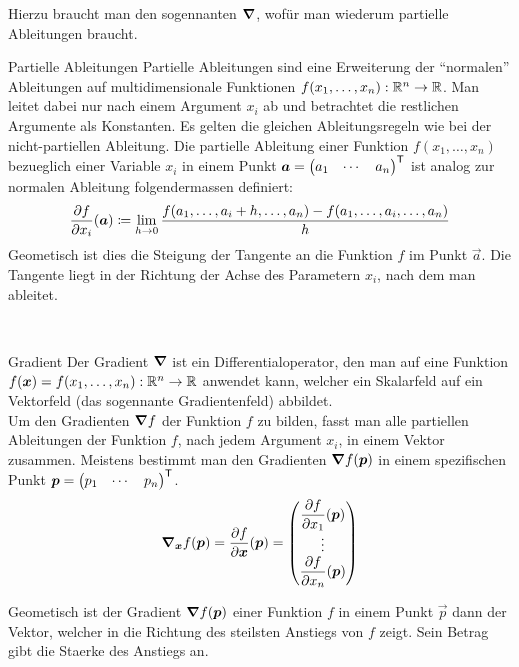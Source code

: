 Hierzu braucht man den sogennanten  $\bm{\nabla}$, wofür man wiederum partielle Ableitungen braucht.
\para{}
\begin{defbox}{Partielle Ableitungen}\label{ref:partielle_ableitungen}
  Partielle Ableitungen sind eine Erweiterung der ``normalen'' Ableitungen auf
  multidimensionale Funktionen $f(x_1,\ldots,x_n): \mathbb{R}^n \to \mathbb{R}$.
  Man leitet dabei nur nach einem Argument $x_i$ ab und betrachtet die restlichen Argumente als Konstanten.
  Es gelten die gleichen Ableitungsregeln wie bei der nicht-partiellen Ableitung.
  Die partielle Ableitung einer Funktion $f(x_1,\ldots,x_n)$ bezueglich einer
  Variable $x_i$ in einem Punkt $\bm{a} = \begin{pmatrix} a_1 & \cdots & a_n \end{pmatrix}^{\mathsf{T}}$
  ist analog zur normalen Ableitung folgendermassen definiert:
  \begin{equation*}
    \frac{\partial f}{\partial x_i}(\bm{a}) \coloneqq \lim_{h \to 0} \frac{f(a_1,\ldots,a_i + h,\ldots,a_n)-f(a_1,\ldots,a_i,\ldots,a_n)}{h}
  \end{equation*}
  Geometisch ist dies die Steigung der Tangente an die Funktion $f$ im Punkt
  $\vec{a}$. Die Tangente liegt in der Richtung der Achse des Parametern $x_i$, nach dem man ableitet.
\end{defbox}
\\
\begin{defbox}{Gradient}
  Der Gradient $\bm{\nabla}$ ist ein Differentialoperator, den man auf eine
  Funktion $f(\bm{x}) = f(x_1,\ldots,x_n): \mathbb{R}^n \to \mathbb{R}$ anwendet kann, welcher ein Skalarfeld auf ein Vektorfeld (das sogennante Gradientenfeld) abbildet.\\
  Um den Gradienten $\bm{\nabla}f$ der Funktion $f$ zu bilden, fasst man alle partiellen Ableitungen der Funktion $f$, nach jedem
  Argument $x_i$, in einem Vektor zusammen. Meistens bestimmt man den Gradienten
  $\bm{\nabla} f(\bm{p})$ in einem spezifischen Punkt $\bm{p} =
  \begin{pmatrix} p_1 & \cdots & p_n \end{pmatrix}^{\mathsf{T}}$.
  \begin{equation*}
    \bm{\nabla}_{\bm{x}} f(\bm{p}) = \displaystyle\frac{\partial f}{\partial \bm{x}}(\bm{p}) =
    \begin{pmatrix}
      \displaystyle\frac{\partial f}{\partial x_1}(\bm{p}) \\
      \vdots \\
      \displaystyle\frac{\partial f}{\partial x_n}(\bm{p}) \\
    \end{pmatrix}
  \end{equation*}

  Geometisch ist der Gradient $\bm{\nabla}f(\bm{p})$ einer Funktion $f$ in einem Punkt $\vec{p}$ dann der Vektor, welcher in die Richtung des steilsten Anstiegs von $f$ zeigt.
  Sein Betrag gibt die Staerke des Anstiegs an.
\end{defbox}
